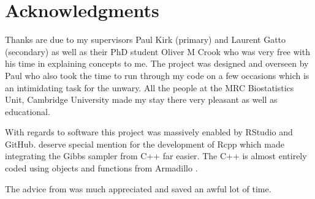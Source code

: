 \documentclass[11pt]{article} %
\begin{document}
\section*{Acknowledgments}
Thanks are due to my supervisors Paul Kirk (primary) and Laurent Gatto (secondary) as well as their PhD student Oliver M Crook who was very free with his time in explaining concepts to me. The project was designed and overseen by Paul who also took the time to run through my code on a few occasions which is an intimidating task for the unwary. All the people at the MRC Biostatistics Unit, Cambridge University made my stay there very pleasant as well as educational.

With regards to software this project was massively enabled by RStudio \cite{RStudioTeamRStudioIntegratedDevelopment2016} and GitHub. \citet{EddelbuettelRcppSeamlessIntegration2011} deserve special mention for the development of Rcpp which made integrating the Gibbs sampler from C++ far easier. The C++ is almost entirely coded using objects and functions from Armadillo \cite{SandersonArmadillotemplatebasedlibrary2016}.

The advice from \citet{BryanExcusemeyou} was much appreciated and saved an awful lot of time. 
\newpage
%


\end{document}
